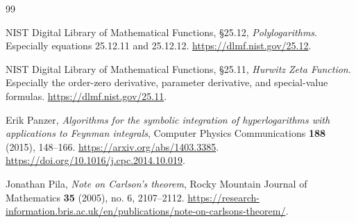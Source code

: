 \documentclass[11pt]{article}
\numberwithin{equation}{section}
\theoremstyle{plain}
\theoremstyle{definition}
\theoremstyle{remark}
\begin{document}
\begin{thebibliography}{99}


NIST Digital Library of Mathematical Functions, \S25.12,
\emph{Polylogarithms}. Especially equations 25.12.11 and 25.12.12.
\url{https://dlmf.nist.gov/25.12}.

NIST Digital Library of Mathematical Functions, \S25.11,
\emph{Hurwitz Zeta Function}. Especially the order-zero derivative,
parameter derivative, and special-value formulas.
\url{https://dlmf.nist.gov/25.11}.

Erik Panzer, \emph{Algorithms for the symbolic integration of
hyperlogarithms with applications to Feynman integrals},
Computer Physics Communications \textbf{188} (2015), 148--166.
\url{https://arxiv.org/abs/1403.3385}.
\url{https://doi.org/10.1016/j.cpc.2014.10.019}.

Jonathan Pila, \emph{Note on Carlson's theorem},
Rocky Mountain Journal of Mathematics \textbf{35} (2005), no. 6,
2107--2112.
\url{https://research-information.bris.ac.uk/en/publications/note-on-carlsons-theorem/}.

\end{thebibliography}

\end{document}
